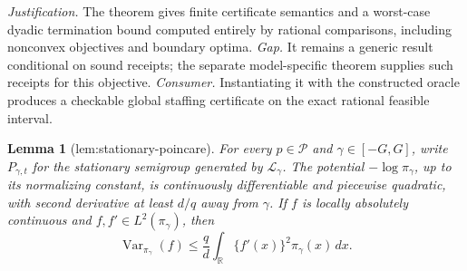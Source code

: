 \documentclass{article}
\newtheorem{lemma}{Lemma}
\begin{document}
\par\smallskip\noindent \textit{Justification.} The theorem gives finite certificate semantics and a worst-case dyadic termination bound computed entirely by rational comparisons, including nonconvex objectives and boundary optima. \textit{Gap.} It remains a generic result conditional on sound receipts; the separate model-specific theorem supplies such receipts for this objective. \textit{Consumer.} Instantiating it with the constructed oracle produces a checkable global staffing certificate on the exact rational feasible interval.

\begin{lemma}[lem:stationary-poincare]\label{lem:stationary-poincare}
For every \(p\in\mathcal P\) and \(\gamma\in[-G,G]\), write \(P_{\gamma,t}\) for the stationary semigroup generated by \(\mathcal L_\gamma\).  The potential \(-\log\pi_\gamma\), up to its normalizing constant, is continuously differentiable and piecewise quadratic, with second derivative at least \(d/q\) away from \(\gamma\).  If \(f\) is locally absolutely continuous and \(f,f'\in L^2(\pi_\gamma)\), then
\[
 \operatorname{Var}_{\pi_\gamma}(f)
 \leq \frac qd\int_{\mathbb R}\{f'(x)\}^2\pi_\gamma(x)\,dx .
\]
\end{lemma}
\end{document}
